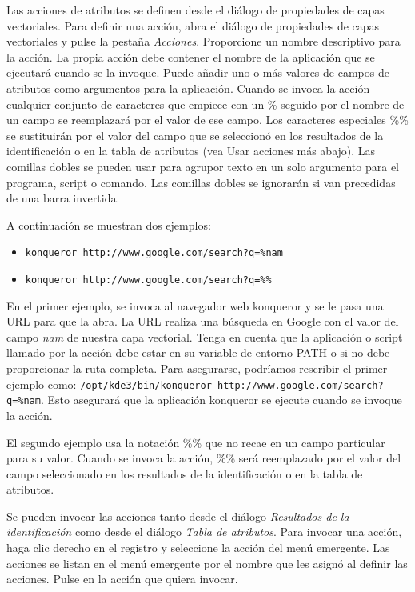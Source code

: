 Las acciones de atributos se definen desde el diálogo de propiedades de capas vectoriales. Para definir una acción, abra el diálogo de propiedades de capas vectoriales y pulse la pestaña \textit{Acciones}. Proporcione un nombre descriptivo para la acción. La propia acción debe contener el nombre de la aplicación que se ejecutará cuando se la invoque. Puede añadir uno o más valores de campos de atributos como argumentos para la aplicación. Cuando se invoca la acción cualquier conjunto de caracteres que empiece con un \% seguido por el nombre de un campo se reemplazará por el valor de ese campo. Los caracteres especiales \%\% \index{\%\%}se sustituirán por el valor del campo que se seleccionó en los resultados de la identificación o en la tabla de atributos (vea Usar acciones más abajo). Las comillas dobles se pueden usar para agrupor texto en un solo argumento para el programa, script o comando. Las comillas dobles se ignorarán si van precedidas de una barra invertida.

A continuación se muestran dos ejemplos:

\begin{itemize}
  \item \texttt{konqueror http://www.google.com/search?q=\%nam}
  \item \texttt{konqueror http://www.google.com/search?q=\%\%}
\end{itemize}


En el primer ejemplo, se invoca al navegador web konqueror y se le pasa una URL para que la abra. La URL realiza una búsqueda en Google con el valor del campo \textit{nam} de nuestra capa vectorial. Tenga en cuenta que la aplicación o script llamado por la acción debe estar en su variable de entorno PATH o si no debe proporcionar la ruta completa. Para asegurarse, podríamos rescribir el primer ejemplo como: \texttt{/opt/kde3/bin/konqueror
http://www.google.com/search?q=\%nam}. Esto asegurará que la aplicación konqueror se ejecute cuando se invoque la acción.

El segundo ejemplo usa la notación \%\% que no recae en un campo particular para su valor. Cuando se invoca la acción, \%\% será reemplazado por el valor del campo seleccionado en los resultados de la identificación o en la tabla de atributos.

\label{label_usingactions}

Se pueden invocar las acciones tanto desde el diálogo \textit{Resultados de la identificación} como desde el diálogo \textit{Tabla de atributos}. Para invocar una acción, haga clic derecho en el registro y seleccione la acción del menú emergente. Las acciones se listan en el menú emergente por el nombre que les asignó al definir las acciones. Pulse en la acción que quiera invocar.


